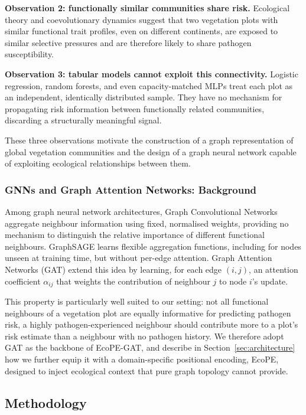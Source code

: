 \documentclass[a4paper,fleqn]{cas-sc}
\begin{document}
\textbf{Observation 2: functionally similar communities share risk.} Ecological theory and coevolutionary dynamics suggest that two vegetation plots with similar functional trait profiles, even on different continents, are exposed to similar selective pressures and are therefore likely to share pathogen susceptibility.

\textbf{Observation 3: tabular models cannot exploit this connectivity.} Logistic regression, random forests, and even capacity-matched MLPs treat each plot as an independent, identically distributed sample. They have no mechanism for propagating risk information between functionally related communities, discarding a structurally meaningful signal.

These three observations motivate the construction of a graph representation of global vegetation communities and the design of a graph neural network capable of exploiting ecological relationships between them.

\subsubsection{GNNs and Graph Attention Networks: Background}
\label{sec:gat-background}

Among graph neural network architectures, Graph Convolutional Networks aggregate neighbour information using fixed, normalised weights, providing no mechanism to distinguish the relative importance of different functional neighbours. GraphSAGE learns flexible aggregation functions, including for nodes unseen at training time, but without per-edge attention. Graph Attention Networks (GAT) extend this idea by learning, for each edge $(i,j)$, an attention coefficient $\alpha_{ij}$ that weights the contribution of neighbour $j$ to node $i$'s update.

This property is particularly well suited to our setting: not all functional neighbours of a vegetation plot are equally informative for predicting pathogen risk, a highly pathogen-experienced neighbour should contribute more to a plot's risk estimate than a neighbour with no pathogen history. We therefore adopt GAT as the backbone of EcoPE-GAT, and describe in Section~\ref{sec:architecture} how we further equip it with a domain-specific positional encoding, EcoPE, designed to inject ecological context that pure graph topology cannot provide.

\subsection{Methodology}
\label{sec:overview}
\end{document}
